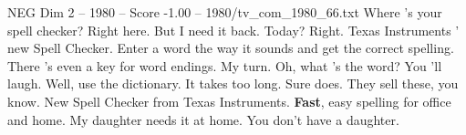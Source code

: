 \begin{textsample}{NEG Dim 2 – 1980 – Score -1.00 – 1980/tv\_com\_1980\_66.txt}  \label{ex:f2_neg_030}
Where 's your spell checker?
Right here.
But I need it back.
Today?
Right.
Texas Instruments ' new Spell Checker.
Enter a word the way it sounds and get the correct spelling.
There 's even a key for word endings.
My turn.
Oh, what 's the word?
You 'll laugh.
Well, use the dictionary.
It takes too long.
Sure does.
They sell these, you know.
New Spell Checker from Texas Instruments. \textbf{Fast}, easy spelling for office and home.
My daughter needs it at home.
You don't have a daughter.

\end{textsample}
